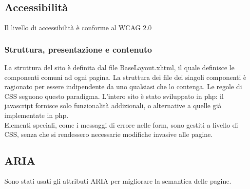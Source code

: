 \documentclass[12pt, a4paper]{article}
\begin{document}
\subsection{Accessibilità}
Il livello di accessibilità è conforme al WCAG 2.0
\subsubsection*{Struttura, presentazione e contenuto}
La struttura del sito è definita dal file BaseLayout.xhtml, il quale definisce le componenti comuni ad ogni pagina. La struttura dei file dei singoli componenti è ragionato per essere indipendente da uno qualsiasi che lo contenga. Le regole di CSS seguono questo paradigma. L'intero sito è stato sviluppato in php: il javascript fornisce solo funzionalità addizionali, o alternative a quelle già implementate in php. \\
Elementi speciali, come i messaggi di errore nelle form, sono gestiti a livello di CSS, senza che si rendessero necessarie modifiche invasive alle pagine.
\subsection*{ARIA}
Sono stati usati gli attributi ARIA per migliorare la semantica delle pagine.
\end{document}
